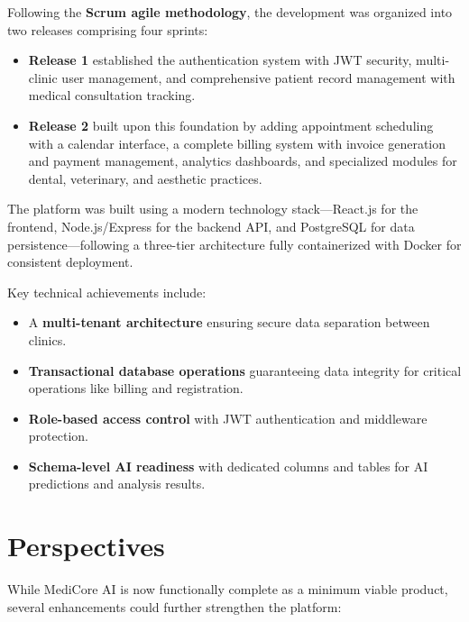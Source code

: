 \documentclass[12pt,a4paper,oneside]{report}
\begin{document}
Following the \textbf{Scrum agile methodology}, the development was organized into two releases comprising four sprints:

\begin{itemize}
    \item \textbf{Release 1} established the authentication system with JWT security, multi-clinic user management, and comprehensive patient record management with medical consultation tracking.
    \item \textbf{Release 2} built upon this foundation by adding appointment scheduling with a calendar interface, a complete billing system with invoice generation and payment management, analytics dashboards, and specialized modules for dental, veterinary, and aesthetic practices.
\end{itemize}

The platform was built using a modern technology stack---React.js for the frontend, Node.js/Express for the backend API, and PostgreSQL for data persistence---following a three-tier architecture fully containerized with Docker for consistent deployment.

Key technical achievements include:
\begin{itemize}
    \item A \textbf{multi-tenant architecture} ensuring secure data separation between clinics.
    \item \textbf{Transactional database operations} guaranteeing data integrity for critical operations like billing and registration.
    \item \textbf{Role-based access control} with JWT authentication and middleware protection.
    \item \textbf{Schema-level AI readiness} with dedicated columns and tables for AI predictions and analysis results.
\end{itemize}

\section*{Perspectives}

While MediCore AI is now functionally complete as a minimum viable product, several enhancements could further strengthen the platform:
\end{document}
